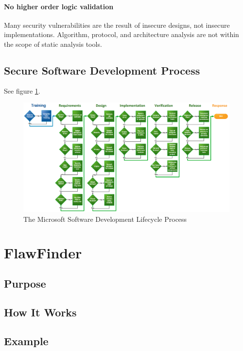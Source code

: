 \documentclass[journal]{IEEEtran}
\begin{document}
\paragraph{No higher order logic validation} Many security vulnerabilities are the result of
insecure designs, not insecure implementations. Algorithm, protocol, and architecture analysis are
not within the scope of static analysis tools.

\subsection{Secure Software Development Process}

See figure \ref{fig:ms_sdl}.

\afterpage{\clearpage}
\begin{figure}
\centerline{\includegraphics[width=1.1\linewidth,height=1.1\textheight,keepaspectratio]{images/microsoft_sdl_process.png}}
\caption{The Microsoft Software Development Lifecycle Process \cite{ms_sdl}}
\label{fig:ms_sdl}
\end{figure}


\section{FlawFinder}

\subsection{Purpose}

\subsection{How It Works}

\subsection{Example}
\end{document}
